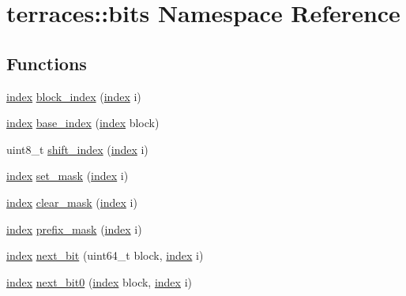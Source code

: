 \hypertarget{namespaceterraces_1_1bits}{}\section{terraces\+:\+:bits Namespace Reference}
\label{namespaceterraces_1_1bits}
\subsection*{Functions}
\begin{DoxyCompactItemize}
\item 
\hyperlink{namespaceterraces_adbc33ccb543d1634e96d0eb02e472c77}{index} \hyperlink{namespaceterraces_1_1bits_abeaebe2ada42cd4172c5e6d751168e91}{block\+\_\+index} (\hyperlink{namespaceterraces_adbc33ccb543d1634e96d0eb02e472c77}{index} i)
\item 
\hyperlink{namespaceterraces_adbc33ccb543d1634e96d0eb02e472c77}{index} \hyperlink{namespaceterraces_1_1bits_ad5a8d095df6a0b6ff47728a0e9325860}{base\+\_\+index} (\hyperlink{namespaceterraces_adbc33ccb543d1634e96d0eb02e472c77}{index} block)
\item 
uint8\+\_\+t \hyperlink{namespaceterraces_1_1bits_ab572e0592b3131f5450c412546b8bcbd}{shift\+\_\+index} (\hyperlink{namespaceterraces_adbc33ccb543d1634e96d0eb02e472c77}{index} i)
\item 
\hyperlink{namespaceterraces_adbc33ccb543d1634e96d0eb02e472c77}{index} \hyperlink{namespaceterraces_1_1bits_a565f9c808bbf7e0d4c9d75ab7a2cadbf}{set\+\_\+mask} (\hyperlink{namespaceterraces_adbc33ccb543d1634e96d0eb02e472c77}{index} i)
\item 
\hyperlink{namespaceterraces_adbc33ccb543d1634e96d0eb02e472c77}{index} \hyperlink{namespaceterraces_1_1bits_a45be18f00889c65a814781516e5c96a7}{clear\+\_\+mask} (\hyperlink{namespaceterraces_adbc33ccb543d1634e96d0eb02e472c77}{index} i)
\item 
\hyperlink{namespaceterraces_adbc33ccb543d1634e96d0eb02e472c77}{index} \hyperlink{namespaceterraces_1_1bits_a82c0d409c7b68413f6063811735de7b6}{prefix\+\_\+mask} (\hyperlink{namespaceterraces_adbc33ccb543d1634e96d0eb02e472c77}{index} i)
\item 
\hyperlink{namespaceterraces_adbc33ccb543d1634e96d0eb02e472c77}{index} \hyperlink{namespaceterraces_1_1bits_abe8eb4f9b54c03369c115e304cf45028}{next\+\_\+bit} (uint64\+\_\+t block, \hyperlink{namespaceterraces_adbc33ccb543d1634e96d0eb02e472c77}{index} i)
\item 
\hyperlink{namespaceterraces_adbc33ccb543d1634e96d0eb02e472c77}{index} \hyperlink{namespaceterraces_1_1bits_a4d77ee6f4943a8062aff70178be1c5e7}{next\+\_\+bit0} (\hyperlink{namespaceterraces_adbc33ccb543d1634e96d0eb02e472c77}{index} block, \hyperlink{namespaceterraces_adbc33ccb543d1634e96d0eb02e472c77}{index} i)

\end{DoxyCompactItemize}
